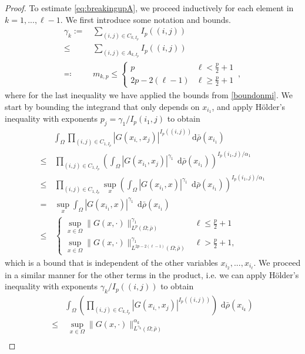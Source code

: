 \documentclass[a4paper,10pt,twoside]{amsart}
\newcommand{\dx}[1]{\,\mathrm{d}#1}  %
\theoremstyle{remark}
\theoremstyle{definition}
\numberwithin{equation}{section}
\newcommand{\0}{{\bf 0}}
\newcommand{\+}{\hspace{-.5ex}+\hspace{-.5ex}}
\begin{document}
\begin{proof}
To estimate \eqref{eq:breakingupA}, we proceed inductively for each element in $k=1,...,\ell-1$. We first introduce some notation and bounds.
\begin{align}
\gamma_k:=& \,\sum_{(i,j)\in C_{k,I_p}}I_p((i,j))\\\leq&\,\sum_{(i,j)\in A_{k,I_p}}I_p((i,j))\\
\eqqcolon&\, m_{k,p}\le \begin{cases}
    p&\ell<\frac{p}{2}+1\\
    2p-2(\ell-1)& \ell\ge \frac{p}{2}+1
\end{cases}
\, ,
\end{align}
where for the last inequality we have applied the bounds from \eqref{boundonmi}.
We start by bounding the integrand that only depends on $x_{i_1}$, and apply H\"older's inequality with exponents $p_j=\gamma_1/I_p(i_1,j)$ to obtain
\begin{align}
&\int_{\Omega}\prod_{(i,j)\in C_{1,I_p}}|G(x_{i,},x_{j})|^{I_p((i,j))}\mathrm{{d}}\bar\rho(x_{i_1})\\
\le & \, \prod_{(i,j)\in C_{1,I_p}} \left(\int_\Omega |G(x_{i_1},x_{j})|^{\gamma_1}\;\dx \bar\rho(x_{i_1})\right)^{I_p(i_1,j)/\alpha_1}\\
\le & \, \prod_{(i,j)\in C_{1,I_p}}\sup_x \left(\int_\Omega |G(x_{i_1},x)|^{\gamma_1}\;\dx \bar\rho(x_{i_1})\right)^{I_p(i_1,j)/\alpha_1}\\
= & \,\sup_x\int_\Omega |G(x_{i_1},x)|^{\gamma_1}\;\dx \bar\rho(x_{i_1})\\
\leq &   \,
 \begin{cases}
  \displaystyle\sup_{x \in \Omega} \lVert  G(x,\cdot)\rVert_{L^p(\Omega;\bar\rho)}^{\gamma_1} & \ell \leq \frac p2 +1 \\
  \displaystyle \sup_{x \in \Omega} \lVert  G(x,\cdot)\rVert_{L^{2p-2(\ell-1)}(\Omega;\bar\rho)}^{\gamma_1} & \ell > \frac p2 +1,
  \end{cases}
\end{align}
which is a bound that is independent of the other variables $x_{i_2},...,x_{i_\ell}$. We proceed in a similar manner for the other terms in the product, i.e. we can apply H\"older's inequality with exponents $\gamma_k/I_p((i,j))$ to obtain
\begin{align}
 &  \int_{\Omega}\left(\prod_{(i,j)\in C_{k,I_p}}|G(x_{i,},x_{j})|^{I_p((i,j))}\right) \, \dx{\bar\rho}(x_{i_k}) \\
\leq & \,  \, \sup_{x \in \Omega} \lVert  G(x,\cdot)\rVert_{L^{\gamma_k}(\Omega;\bar\rho)}^{\alpha_k}\\

\end{align}
\end{proof}
\end{document}
